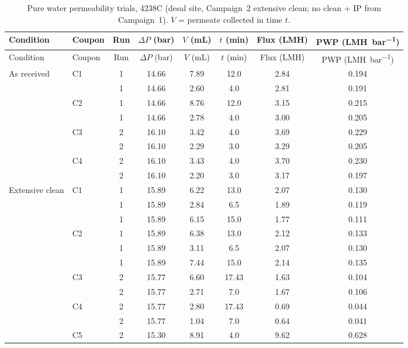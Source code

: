 {\footnotesize
\begin{longtable}{llcccccc}
  \caption{Pure water permeability trials, 4238C (desal site, Campaign~2 extensive clean; no clean + IP from Campaign~1). $V$ = permeate collected in time $t$.}
  \label{tab:app-pwp-4238C}\\
  \toprule
  Condition & Coupon & Run & $\Delta P$ (\unit{bar}) & $V$ (\unit{mL}) & $t$ (\unit{min}) & Flux (\unit{LMH}) & PWP (\unit{LMH.bar^{-1}}) \\
  \midrule
  \endfirsthead
  \toprule
  Condition & Coupon & Run & $\Delta P$ (\unit{bar}) & $V$ (\unit{mL}) & $t$ (\unit{min}) & Flux (\unit{LMH}) & PWP (\unit{LMH.bar^{-1}}) \\
  \midrule
  \endhead
  \bottomrule
  \endfoot
  As received & C1 & 1 & 14.66 & 7.89 & 12.0 & 2.84 & 0.194 \\
   &  & 1 & 14.66 & 2.60 & 4.0 & 2.81 & 0.191 \\
  \addlinespace[2pt]
   & C2 & 1 & 14.66 & 8.76 & 12.0 & 3.15 & 0.215 \\
   &  & 1 & 14.66 & 2.78 & 4.0 & 3.00 & 0.205 \\
  \addlinespace[2pt]
   & C3 & 2 & 16.10 & 3.42 & 4.0 & 3.69 & 0.229 \\
   &  & 2 & 16.10 & 2.29 & 3.0 & 3.29 & 0.205 \\
  \addlinespace[2pt]
   & C4 & 2 & 16.10 & 3.43 & 4.0 & 3.70 & 0.230 \\
   &  & 2 & 16.10 & 2.20 & 3.0 & 3.17 & 0.197 \\
  \midrule
  Extensive clean & C1 & 1 & 15.89 & 6.22 & 13.0 & 2.07 & 0.130 \\
   &  & 1 & 15.89 & 2.84 & 6.5 & 1.89 & 0.119 \\
   &  & 1 & 15.89 & 6.15 & 15.0 & 1.77 & 0.111 \\
  \addlinespace[2pt]
   & C2 & 1 & 15.89 & 6.38 & 13.0 & 2.12 & 0.133 \\
   &  & 1 & 15.89 & 3.11 & 6.5 & 2.07 & 0.130 \\
   &  & 1 & 15.89 & 7.44 & 15.0 & 2.14 & 0.135 \\
  \addlinespace[2pt]
   & C3 & 2 & 15.77 & 6.60 & 17.43 & 1.63 & 0.104 \\
   &  & 2 & 15.77 & 2.71 & 7.0 & 1.67 & 0.106 \\
  \addlinespace[2pt]
   & C4 & 2 & 15.77 & 2.80 & 17.43 & 0.69 & 0.044 \\
   &  & 2 & 15.77 & 1.04 & 7.0 & 0.64 & 0.041 \\
  \addlinespace[2pt]
   & C5 & 2 & 15.30 & 8.91 & 4.0 & 9.62 & 0.628 \\

\end{longtable}}
